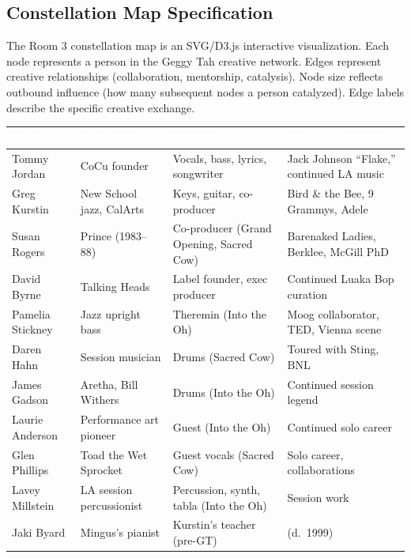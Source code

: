 \documentclass[11pt,letterpaper]{article}
\newcommand{\tableheader}[1]{\textbf{\sffamily\textcolor{white}{#1}}}
\begin{document}
\subsection{Constellation Map Specification}

The Room 3 constellation map is an SVG/D3.js interactive visualization. Each node represents a person in the Geggy Tah creative network. Edges represent creative relationships (collaboration, mentorship, catalysis). Node size reflects outbound influence (how many subsequent nodes a person catalyzed). Edge labels describe the specific creative exchange.

\begin{center}
\begin{tabularx}{\textwidth}{L{3cm}L{2.5cm}L{2.5cm}X}
\toprule
{}
\tableheader{Node} & \tableheader{Prior Path} & \tableheader{GT Role} & \tableheader{Subsequent Path} \\
\midrule
Tommy Jordan & CoCu founder & Vocals, bass, lyrics, songwriter & Jack Johnson ``Flake,'' continued LA music \\
Greg Kurstin & New School jazz, CalArts & Keys, guitar, co-producer & Bird \& the Bee, 9 Grammys, Adele \\
Susan Rogers & Prince (1983--88) & Co-producer (Grand Opening, Sacred Cow) & Barenaked Ladies, Berklee, McGill PhD \\
David Byrne & Talking Heads & Label founder, exec producer & Continued Luaka Bop curation \\
Pamelia Stickney & Jazz upright bass & Theremin (Into the Oh) & Moog collaborator, TED, Vienna scene \\
Daren Hahn & Session musician & Drums (Sacred Cow) & Toured with Sting, BNL \\
James Gadson & Aretha, Bill Withers & Drums (Into the Oh) & Continued session legend \\
Laurie Anderson & Performance art pioneer & Guest (Into the Oh) & Continued solo career \\
Glen Phillips & Toad the Wet Sprocket & Guest vocals (Sacred Cow) & Solo career, collaborations \\
Lavey Millstein & LA session percussionist & Percussion, synth, tabla (Into the Oh) & Session work \\
Jaki Byard & Mingus's pianist & Kurstin's teacher (pre-GT) & (d.\ 1999) \\
\bottomrule
\end{tabularx}
\end{center}
\end{document}
